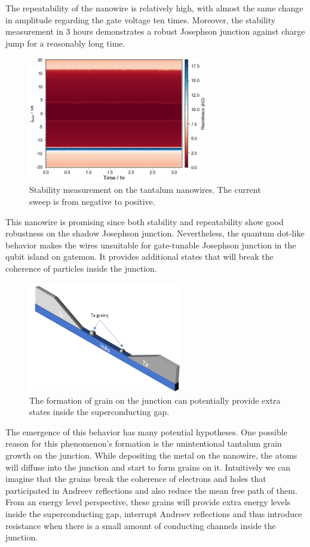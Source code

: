 The repeatability of the nanowire is relatively high, with almost the same change in amplitude regarding the gate voltage ten times. Moreover, the stability measurement in 3 hours demonstrates a robust Josephson junction against charge jump for a reasonably long time.

\begin{figure}[h!]
    \centering
    \includegraphics[width=0.7\textwidth]{Pic/Ibias_sta.jpg}
    \caption{Stability measurement on the tantalum nanowires. The current sweep is from negative to positive.}
    \label{fig:my_label}
\end{figure}


This nanowire is promising since both stability and repeatability show good robustness on the shadow Josephson junction. Nevertheless, the quantum dot-like behavior makes the wires unsuitable for gate-tunable Josephson junction in the qubit island on gatemon. It provides additional states that will break the coherence of particles inside the junction. 
\begin{figure}[h!]
    \centering
    \includegraphics[width=0.6\textwidth]{Pic/TaGrain.png}
    \caption{The formation of grain on the junction can potentially provide extra states inside the superconducting gap.}
    \label{fig:my_label}
\end{figure}
The emergence of this behavior has many potential hypotheses. One possible reason for this phenomenon's formation is the unintentional tantalum grain growth on the junction. While depositing the metal on the nanowire, the atoms will diffuse into the junction and start to form grains on it. Intuitively we can imagine that the grains break the coherence of electrons and holes that participated in Andreev reflections and also reduce the mean free path of them. From an energy level perspective, these grains will provide extra energy levels inside the superconducting gap, interrupt Andreev reflections and thus introduce resistance when there is a small amount of conducting channels inside the junction. 


